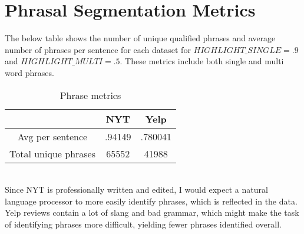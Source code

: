 \documentclass{article}
\begin{document}
\section*{Phrasal Segmentation Metrics}
The below table shows the number of unique qualified phrases and average number of phrases per sentence for each dataset for $HIGHLIGHT\_SINGLE=.9$ and $HIGHLIGHT\_MULTI=.5$.  These metrics include both single and multi word phrases.
\begin{table}[ht]
    \centering
    \begin{tabular}{|c|c|c|}
        \hline
        & NYT & Yelp \\
        \hline
        Avg per sentence & .94149 & .780041 \\
        \hline
        Total unique phrases & 65552 & 41988\\
        \hline
    \end{tabular}
    \caption{Phrase metrics}
    \label{tab:my_label}
\end{table}\\
Since NYT is professionally written and edited, I would expect a natural language processor to more easily identify phrases, which is reflected in the data.  Yelp reviews contain a lot of slang and bad grammar, which might make the task of identifying phrases more difficult, yielding fewer phrases identified overall.\\\\
\end{document}
